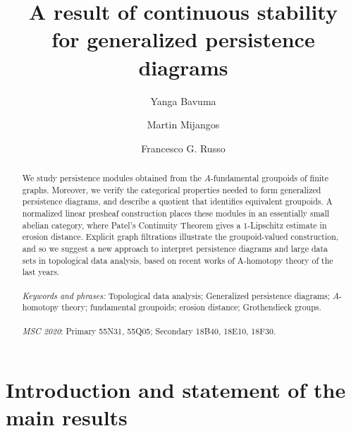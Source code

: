 \documentclass{amsart}
\title[A result of continuous stability for generalized persistence diagrams]{A result of continuous stability\\ 
for generalized persistence diagrams}
\author[Y. Bavuma]{Yanga Bavuma}
\author[M. Mijangos]{Martin Mijangos}
\author[F.G. Russo]{Francesco G. Russo}
\begin{document}
\begin{abstract}
We study persistence modules obtained from the $A$-fundamental groupoids of finite graphs. Moreover, we verify the categorical properties needed to form generalized persistence diagrams, and describe a quotient that identifies equivalent groupoids. A normalized linear presheaf construction places these modules in an essentially small abelian category, where Patel's Continuity Theorem gives a $1$-Lipschitz estimate in erosion distance. Explicit graph filtrations illustrate the groupoid-valued construction, and so we suggest a new approach to interpret persistence diagrams and large data sets in topological data analysis,  based on recent works of  A-homotopy theory of the last years.\\
\\
\textit{Keywords and phrases:} Topological data analysis; Generalized persistence diagrams; \(A\)-homotopy theory; fundamental groupoids; erosion distance; Grothendieck groups.\\
\\
\textit{MSC 2020}: Primary 55N31, 55Q05; Secondary 18B40, 18E10, 18F30. 
\end{abstract}
\maketitle

\section{Introduction and statement of the main results}
\end{document}
